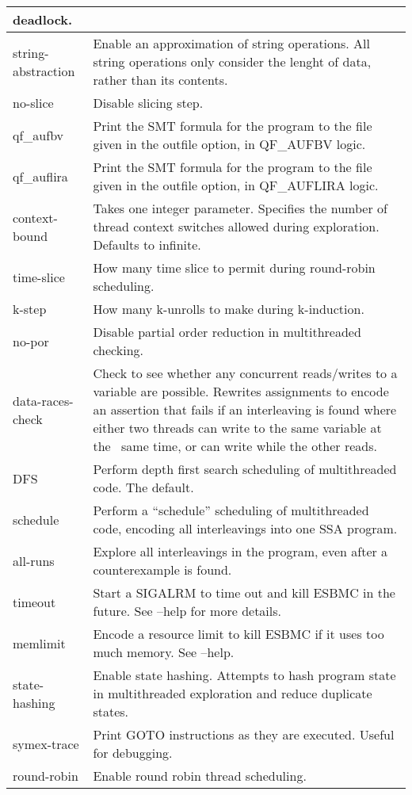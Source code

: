 \documentclass{article}
\begin{document}
\begin{longtable}{| p{} | p{} |}
deadlock.\\
\hline
string-abstraction & Enable an approximation of string operations. All string
operations only consider the lenght of data, rather than its contents.\\
\hline
no-slice & Disable slicing step.\\
\hline
qf\_aufbv & Print the SMT formula for the program to the file given in the
outfile option, in QF\_AUFBV logic.\\
\hline
qf\_auflira & Print the SMT formula for the program to the file given in the
outfile option, in QF\_AUFLIRA logic.\\
\hline
context-bound & Takes one integer parameter. Specifies the number of thread
context switches allowed during exploration. Defaults to infinite.\\
\hline
time-slice & How many time slice to permit during round-robin scheduling.\\
\hline
k-step & How many k-unrolls to make during k-induction.\\
\hline
no-por & Disable partial order reduction in multithreaded checking.\\
\hline
data-races-check & Check to see whether any concurrent reads/writes to a
variable are possible. Rewrites assignments to encode an assertion that fails
if an interleaving is found where either two threads can write to the same
variable at the ~same time, or can write while the other reads.\\
\hline
DFS & Perform depth first search scheduling of multithreaded code. The
default.\\
\hline
schedule & Perform a ``schedule'' scheduling of multithreaded code, encoding
all interleavings into one SSA program.\\
\hline
all-runs & Explore all interleavings in the program, even after a counterexample
is found.\\
\hline
timeout & Start a SIGALRM to time out and kill ESBMC in the future. See --help
for more details.\\
\hline
memlimit & Encode a resource limit to kill ESBMC if it uses too much memory.
See --help.\\
\hline
state-hashing & Enable state hashing. Attempts to hash program state in
multithreaded exploration and reduce duplicate states.\\
\hline
symex-trace & Print GOTO instructions as they are executed. Useful for
debugging.\\
\hline
round-robin & Enable round robin thread scheduling.\\

\end{longtable}
\end{document}
